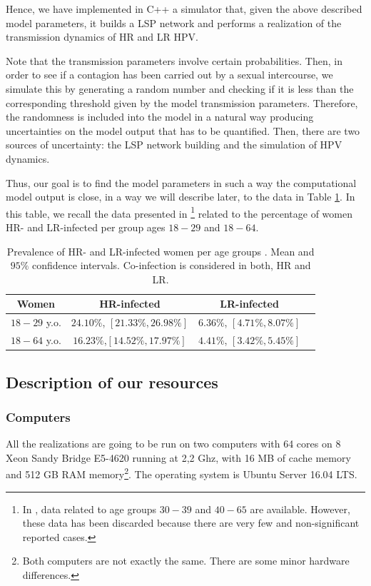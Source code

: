 Hence, we have implemented in C++ a simulator that, given the above described model parameters, it builds a LSP network and performs a realization of the transmission dynamics of HR and LR HPV.

Note that the transmission parameters involve certain probabilities. Then, in order to see if a contagion has been carried out by a sexual intercourse, we simulate this by generating a random number and checking if it is less than the corresponding threshold given by the model transmission parameters. Therefore, the randomness is included into the model in a natural way producing uncertainties on the model output that has to be quantified. Then, there are two sources of uncertainty: the LSP network building and the simulation of HPV dynamics.

Thus, our goal is to find the model parameters in such a way the computational model output is close, in a way we will describe later, to the data in Table \ref{datos}. In this table, we recall the data presented in \cite{castellsague2012prevalence}\footnote{In \cite{castellsague2012prevalence}, data related to age groups $30-39$ and $40-65$ are available. However, these data has been discarded because there are very few and non-significant reported cases.} related to the percentage of women HR- and LR-infected per group ages $18-29$ and $18-64$. \\

\begin{table}[h]
	\centering
	\begin{tabular}{c|ccc}
		Women & HR-infected & LR-infected \\
		\hline
		$18-29$ y.o. & $24.10\%$, $[21.33\%, 26.98\%]$ & $6.36\%$, $[4.71\%, 8.07\%]$ \\
		$18-64$ y.o. & $16.23\%$,$[14.52\%, 17.97\%]$ & $4.41\%$, $[3.42\%, 5.45\%]$ \\
	\end{tabular}
	\caption{Prevalence of HR- and LR-infected women per age groups \cite{castellsague2012prevalence}. Mean and $95\%$ confidence intervals. Co-infection is considered in both, HR and LR.}
	\label{datos}
\end{table}

\subsection{Description of our resources}

\subsubsection{Computers}
All the realizations are going to be run on two computers with 64 cores on 8 Xeon Sandy Bridge E5-4620 running at 2,2 Ghz, with 16 MB of cache memory and 512 GB RAM memory\footnote{Both computers are not exactly the same. There are some minor hardware differences.}. The operating system is Ubuntu Server 16.04 LTS. 

